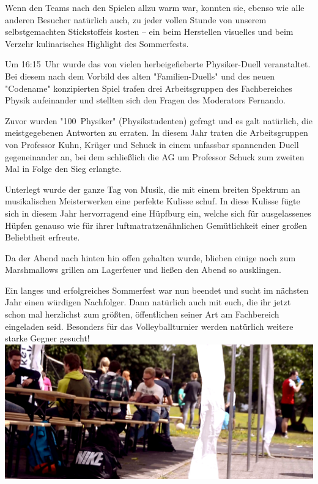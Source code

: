 \begin{multicols*}{2}
Wenn den Teams nach den Spielen allzu warm war, konnten sie, ebenso wie alle anderen Besucher natürlich auch, zu jeder vollen Stunde von unserem selbstgemachten Stickstoffeis kosten -- ein beim Herstellen visuelles und beim Verzehr kulinarisches Highlight des Sommerfests. 

Um 16:15~Uhr wurde das von vielen herbeigefieberte Physiker-Duell veranstaltet.
Bei diesem nach dem Vorbild des alten "Familien-Duells" und des neuen "Codename" konzipierten Spiel trafen drei Arbeitsgruppen des Fachbereiches Physik aufeinander und stellten sich den Fragen des Moderators Fernando.

Zuvor wurden "100~Physiker" (Physikstudenten) gefragt und es galt natürlich, die meistgegebenen Antworten zu erraten.
In diesem Jahr traten die Arbeitsgruppen von Professor Kuhn, Krüger und Schuck in einem unfassbar spannenden Duell gegeneinander an, bei dem schließlich die AG um Professor Schuck zum zweiten Mal in Folge den Sieg erlangte.

Unterlegt wurde der ganze Tag von Musik, die mit einem breiten Spektrum an musikalischen Meisterwerken eine perfekte Kulisse schuf. In diese Kulisse fügte sich in diesem Jahr hervorragend eine Hüpfburg ein, welche sich für ausgelassenes Hüpfen genauso wie für ihrer luftmatratzenähnlichen Gemütlichkeit einer großen Beliebtheit erfreute.

Da der Abend nach hinten hin offen gehalten wurde, blieben einige noch zum Marshmallows grillen am Lagerfeuer und ließen
den Abend so ausklingen.

Ein langes und erfolgreiches Sommerfest war nun beendet und sucht im nächsten Jahr einen würdigen Nachfolger.
Dann natürlich auch mit euch, die ihr jetzt schon mal herzlichst zum größten, öffentlichen seiner Art am Fachbereich eingeladen seid.
Besonders für das Volleyballturnier werden natürlich weitere starke Gegner gesucht!
\includegraphics[width=\columnwidth]{res/sommerfest_zelt_cropped}
\end{multicols*}
